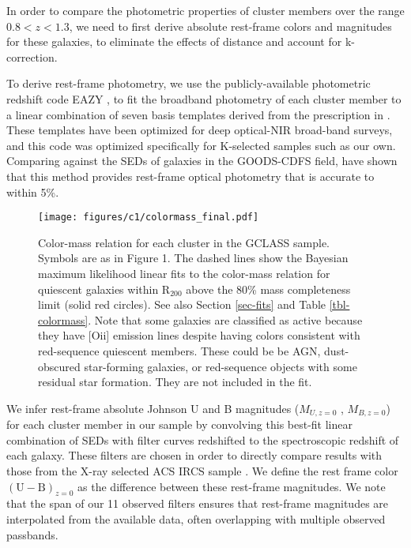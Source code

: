 In order to compare the photometric properties of cluster members over the range $0.8 < z < 1.3$, we need to first derive absolute rest-frame colors and magnitudes for these galaxies, to eliminate the effects of distance and account for k-correction.

To derive rest-frame photometry, we use the publicly-available photometric redshift code EAZY \citep{Brammer:2008uk}, to fit the broadband photometry of each cluster member to a linear combination of seven basis templates derived from the prescription in \citet{Blanton:2007ft}. These templates have been optimized for deep optical-NIR broad-band surveys, and this code was optimized specifically for K-selected samples such as our own. Comparing against the SEDs of galaxies in the GOODS-CDFS field, \citet{Brammer:2008uk} have shown that this method provides rest-frame optical photometry that is accurate to within 5\%.

\begin{figure*}
\centering \texttt{[image: figures/c1/colormass\_final.pdf]}
\caption[Color-mass diagrams for clusters in the GCLASS sample]{Color-mass relation for each cluster in the GCLASS sample. Symbols are as in Figure 1. The dashed lines show the Bayesian maximum likelihood linear fits to the color-mass relation for quiescent galaxies within R$_{200}$ above the 80\% mass completeness limit (solid red circles). See also Section \ref{sec-fits} and Table \ref{tbl-colormass}.
Note that some galaxies are classified as active because they have [O{\sc ii}] emission lines despite having colors consistent with red-sequence quiescent members. These could be be AGN, dust-obscured star-forming galaxies, or red-sequence objects with some residual star formation. They are not included in the fit.\label{fig-colormass}}
\end{figure*}

We infer rest-frame absolute Johnson U and B magnitudes ($M_{U,z=0}$ , $M_{B,z=0}$) for each cluster member in our sample by convolving this best-fit linear combination of SEDs with filter curves redshifted to the spectroscopic redshift of each galaxy. These filters are chosen in order to directly compare results with those from the X-ray selected ACS IRCS sample \citep[][hereafter M09]{Mei:2009wt}. We define the rest frame color $\mathrm{(U-B)}_{z=0}$ as the difference between these rest-frame magnitudes. We note that the span of our 11 observed filters ensures that rest-frame magnitudes are interpolated from the available data, often overlapping with multiple observed passbands.

